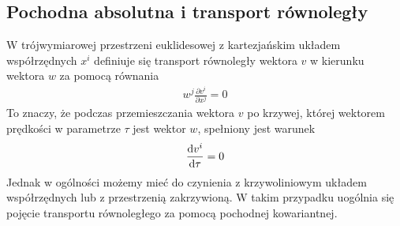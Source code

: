 \subsection{Pochodna absolutna i transport równoległy}
W trójwymiarowej przestrzeni euklidesowej 
z kartezjańskim układem współrzędnych $x^i$ 
definiuje się transport równoległy wektora $v$ w kierunku wektora 
$w$ za pomocą równania 
\begin{align*}
w^j \frac{\partial v^i}{\partial x^j} = 0
\end{align*}
To znaczy, że podczas przemieszczania wektora $v$ po krzywej, której
wektorem prędkości w parametrze $\tau$ jest wektor $w$, spełniony jest 
warunek
\begin{align*}
 \frac{\text{d} v^i}{\text{d} \tau} = 0
\end{align*}
Jednak w ogólności możemy mieć do czynienia z krzywoliniowym układem 
współrzędnych lub z przestrzenią zakrzywioną. W takim przypadku uogólnia
się pojęcie transportu równoległego za pomocą pochodnej kowariantnej.
